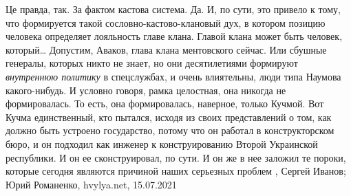 Це правда, так. За фактом кастова система.
Да. И, по сути, это привело к тому, что формируется такой
сословно-кастово-клановый дух, в котором позицию человека определяет лояльность
главе клана. Главой клана может быть человек, который… Допустим, Аваков, глава
клана ментовского сейчас. Или сбушные генералы, которых никто не знает, но они
десятилетиями формируют \emph{внутреннюю политику} в спецслужбах, и очень влиятельны,
люди типа Наумова какого-нибудь. И условно говоря, рамка целостная, она никогда
не формировалась. То есть, она формировалась, наверное, только Кучмой.
Вот Кучма единственный, кто пытался, исходя из своих представлений о том, как
должно быть устроено государство, потому что он работал в конструкторском бюро,
и он подходил как инженер к конструированию Второй Украинской республики. И он
ее сконструировал, по сути. И он же в нее заложил те пороки, которые сегодня
являются причиной наших серьезных проблем
, 
Сергей Иванов; Юрий Романенко, hvylya.net, 15.07.2021
